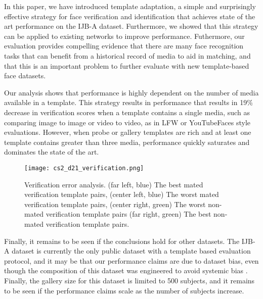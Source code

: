 \documentclass[10pt,twocolumn,letterpaper]{article}
\theoremstyle{definition}		\newtheorem{defn}[thm]{Definition}
\newcommand{\figwidth}{6.85in}
\begin{document}
In this paper, we have introduced template adaptation, a simple and surprisingly effective strategy for face verification and identification that achieves state of the art performance on the IJB-A dataset.  Furthermore, we showed that this strategy can be applied to existing networks to improve performance.  Futhermore, our evaluation provides compelling evidence that there are many face recognition tasks that can benefit from a historical record of media to aid in matching, and that this is an important problem to further evaluate with new template-based face datasets.  



Our analysis shows that performance is highly dependent on the number of media available in a template.  This strategy results in performance that results in 19\% decrease in verification scores when a template contains a single media, such as comparing image to image or video to video, as in LFW or YouTubeFaces style evaluations.  However, when probe or gallery templates are rich and at least one template contains greater than three media, performance quickly saturates and dominates the state of the art.  


\ifdefined\ECCV
\begin{figure*}[t]
\begin{centering}
\texttt{[image: cs2\_d21\_verification.png]} 
\caption{Verification error analysis.  (far left, blue) The best mated verification template pairs, (center left, blue) The worst mated verification template pairs, (center right, green) The worst non-mated verification template pairs (far right, green) The best non-mated verification template pairs.  
}
\label{f:verification_errors}
\end{centering}
\end{figure*}

 \fi




Finally, it remains to be seen if the conclusions hold for other datasets.  The IJB-A dataset is currently the only public dataset with a template based evaluation protocol, and it may be that our performance claims are due to dataset bias, even though the composition of this dataset was engineered to avoid systemic bias \cite{Klare15}.  Finally, the gallery size for this dataset is limited to 500 subjects, and it remains to be seen if the performance claims scale as the number of subjects increase.  
\end{document}
